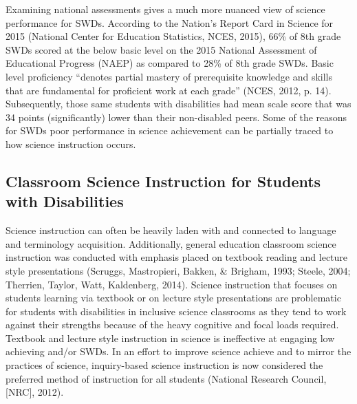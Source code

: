 \documentclass[11.5pt]{sig-alternate} %
\begin{document}
\begin{large}
Examining national assessments gives a much more nuanced view of science performance for SWDs.  According to the Nation’s Report Card in Science for 2015 (National Center for Education Statistics, NCES, 2015), 66\% of 8th grade SWDs scored at the below basic level on the 2015 National Assessment of Educational Progress (NAEP) as compared to 28\% of 8th grade SWDs.  Basic level proficiency “denotes partial mastery of prerequisite knowledge and skills that are fundamental for proficient work at each grade” (NCES, 2012, p. 14).  Subsequently, those same students with disabilities had mean scale score that was 34 points (significantly) lower than their non-disabled peers. Some of the reasons for SWDs poor performance in science achievement can be partially traced to how science instruction occurs.
 
\subsection*{Classroom Science Instruction for Students with Disabilities}

Science instruction can often be heavily laden with and connected to language and terminology acquisition.  Additionally, general education classroom science instruction was conducted with emphasis placed on textbook reading and lecture style presentations (Scruggs, Mastropieri, Bakken, \& Brigham, 1993; Steele, 2004; Therrien, Taylor, Watt, Kaldenberg, 2014).  Science instruction that focuses on students learning via textbook or on lecture style presentations are problematic for students with disabilities in inclusive science classrooms as they tend to work against their strengths because of the heavy cognitive and focal loads required. Textbook and lecture style instruction in science is ineffective at engaging low achieving and/or SWDs.  In an effort to improve science achieve and to mirror the practices of science, inquiry-based science instruction is now considered the preferred method of instruction for all students (National Research Council, [NRC], 2012).  


\end{large}
\end{document}
